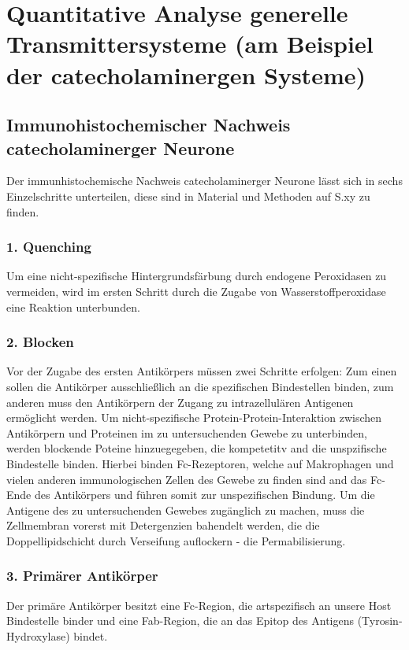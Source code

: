 \documentclass[12pt,a4paper,pdftex]{article}
\begin{document}
\newpage
\section{Quantitative Analyse generelle Transmittersysteme (am Beispiel der catecholaminergen Systeme)}
\label{sec:immu}
\subsection{Immunohistochemischer Nachweis catecholaminerger Neurone}
Der immunhistochemische Nachweis catecholaminerger Neurone lässt sich in sechs Einzelschritte unterteilen, diese sind in Material und Methoden auf S.xy zu finden.

\subsubsection*{1. Quenching}
Um eine nicht-spezifische Hintergrundsfärbung durch endogene Peroxidasen zu vermeiden, wird im ersten Schritt durch die Zugabe von Wasserstoffperoxidase eine Reaktion unterbunden. 

\subsubsection*{2. Blocken}
Vor der Zugabe des ersten Antikörpers müssen zwei Schritte erfolgen: Zum einen sollen die Antikörper ausschließlich an die spezifischen Bindestellen binden, zum anderen muss den Antikörpern der Zugang zu intrazellulären Antigenen ermöglicht werden.
Um nicht-spezifische Protein-Protein-Interaktion zwischen Antikörpern und Proteinen im zu untersuchenden Gewebe zu unterbinden, werden blockende Poteine hinzuegegeben, die kompetetitv and die unspzifische Bindestelle binden. Hierbei binden Fc-Rezeptoren, welche auf Makrophagen und vielen anderen immunologischen Zellen des Gewebe zu finden sind and das Fc-Ende des Antikörpers und führen somit zur unspezifischen Bindung. 
Um die Antigene des zu untersuchenden Gewebes zugänglich zu machen, muss die Zellmembran vorerst mit Detergenzien bahendelt werden, die die Doppellipidschicht durch Verseifung auflockern - die Permabilisierung.

\subsubsection*{3. Primärer Antikörper}
Der primäre Antikörper besitzt eine Fc-Region, die artspezifisch an unsere Host Bindestelle binder und eine Fab-Region, die an das Epitop des Antigens (Tyrosin-Hydroxylase) bindet.
\end{document}
